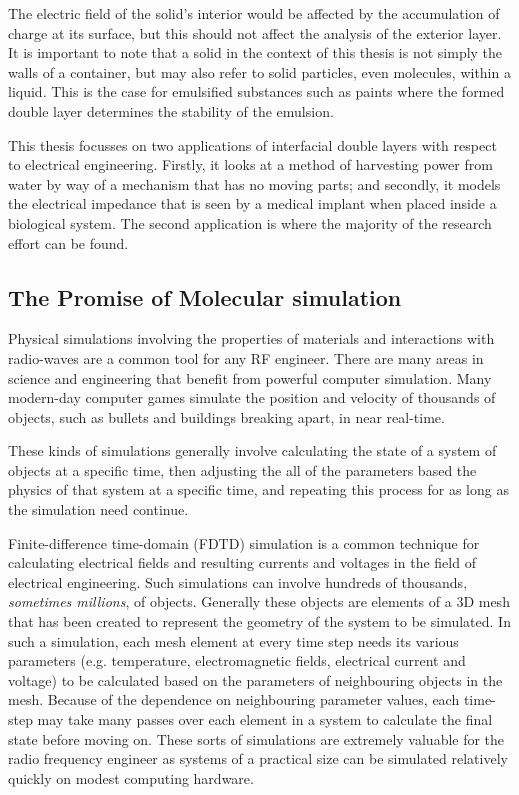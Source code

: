 The electric field of the solid's interior would be affected by the accumulation of charge at its surface, but this should not affect the analysis of the exterior layer.
It is important to note that a solid in the context of this thesis is not simply the walls of a container, but may also refer to solid particles, even molecules, within a liquid.
This is the case for emulsified substances such as paints where the formed double layer determines the stability of the emulsion.

This thesis focusses on two applications of interfacial double layers with respect to electrical engineering. Firstly, it looks at a method of harvesting power from water by way of a mechanism that has no moving parts; and secondly, it models the electrical impedance that is seen by a medical implant when placed inside a biological system. The second application is where the majority of the research effort can be found.

\subsection{The Promise of Molecular simulation}
Physical simulations involving the properties of materials and interactions with radio-waves are a common tool for any RF engineer. There are many areas in science and engineering that benefit from powerful computer simulation. Many modern-day computer games simulate the position and velocity of thousands of objects, such as bullets and buildings breaking apart, in near real-time.

These kinds of simulations generally involve calculating the state of a system of objects at a specific time, then adjusting the all of the parameters based the physics of that system at a specific time, and repeating this process for as long as the simulation need continue.

Finite-difference time-domain (FDTD) simulation is a common technique for calculating electrical fields and resulting currents and voltages in the field of electrical engineering. Such simulations can involve hundreds of thousands, \emph{sometimes millions}, of objects. Generally these objects are elements of a 3D mesh that has been created to represent the geometry of the system to be simulated. In such a simulation, each mesh element at every time step needs its various parameters (e.g. temperature, electromagnetic fields, electrical current and voltage) to be calculated based on the parameters of neighbouring objects in the mesh. Because of the dependence on neighbouring parameter values, each time-step may take many passes over each element in a system to calculate the final state before moving on. These sorts of simulations are extremely valuable for the radio frequency engineer as systems of a practical size can be simulated relatively quickly on modest computing hardware.

